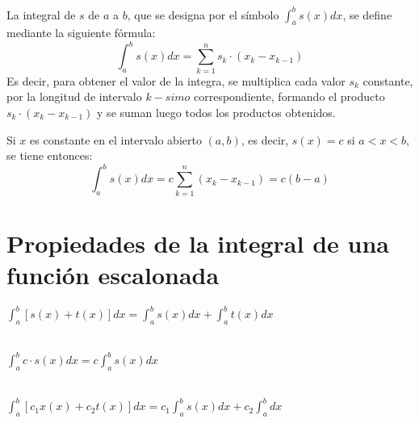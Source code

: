     \begin{tcolorbox}[colframe = white]
	\begin{def.}
	    La integral de $s$ de $a$ a $b$, que se designa por el símbolo $\int_{a}^{b} s(x) dx$, se define mediante la siguiente fórmula: $$\int_{a}^{b} s(x) dx = \sum\limits_{k=1}^{n} s_k \cdot (x_k - x_{k-1})$$
	    Es decir, para obtener el valor de la integra, se multiplica cada valor $s_k$ constante, por la longitud de intervalo $k-simo$ correspondiente, formando el producto $s_k\cdot (x_k - x_{k-1})$ y se suman luego todos los productos obtenidos.
	\end{def.}
    \end{tcolorbox}

    \begin{tcolorbox}[colframe = white]
	\begin{def.}
	    Si $x$ es constante en el intervalo abierto $(a,b)$, es decir, $s(x)=c$ si $a<x<b,$ se tiene entonces: $$\int_{a}^{b} s(x) dx = c \sum\limits_{k=1}^{n} (x_k - x_{k-1}) = c(b-a)$$
	\end{def.}
    \end{tcolorbox}

\section{Propiedades de la integral de una función escalonada}

    \begin{teo}
	$\displaystyle\int_{a}^{b} [s(x) + t(x)] dx = \int_{a}^{b} s(x) dx + \int_{a}^{b} t(x) dx$\\\\
    \end{teo}

    \begin{teo}
	$\displaystyle\int_{a}^{b} c \cdot s(x) dx = c\int_{a}^{b} s(x) dx$\\\\
    \end{teo}

    \begin{teo}
	$\displaystyle\int_{a}^{b} [c_1x(x) + c_2t(x)] dx = c_1 \int_{a}^{b} s(x) dx + c_2 \int_{a}^{b} dx$\\\\
    \end{teo}

